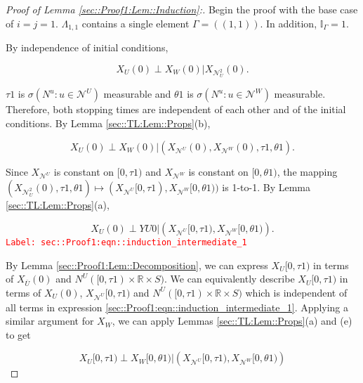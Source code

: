 \documentclass[12pt]{article}
\newcommand{\mb}{\mathbb}
\newcommand{\mc}{\mathcal}
\newcommand{\ov}{\overline}
\newcommand{\tr}{\textcolor{red}}
\newcommand{\labe}[1]{\tr{\texttt{Label: #1}}}
\newcommand{\vv}{u}								%
\renewcommand{\U}{U}							%
\newcommand{\UU}{W}								%
\renewcommand{\S}{S}							%
\newcommand{\X}{X}								%
\newcommand{\neigh}{\mc{N}}						%
\newcommand{\dneigh}{\mc{N}^2}					%
\newcommand{\vind}[1]{^{#1}}					%
\newcommand{\cind}[1]{_{#1}}					%
\newcommand{\cl}{\ov}							%
\newcommand{\tp}[1]{(#1)}						%
\newcommand{\tip}[1]{#1}						%
\newcommand{\poiss}{N}							%
\newcommand{\dnvind}[1]{_{#1}}				%
\newcommand{\XX}{Y}								%
\newcommand{\rt}{\tau}							%
\newcommand{\rtt}{\theta}						%
\newcommand{\apath}{\Gamma}						%
\newcommand{\pathset}[2]{\Lambda_{#1,#2}}		%
\begin{document}
\begin{proof}[Proof of Lemma \ref{sec::Proof1:Lem::Induction}:]
Begin the proof with the base case of \(i=j =1\). \(\pathset{1}{1}\) contains a single element \(\apath{} = ((1,1))\). In addition, \(\mb{I}_{\apath{}} = 1\).

By independence of initial conditions,

\[\X\cind{\U}\tp{0}\perp \X\cind{\UU}\tp{0}|\X\cind{\dneigh\dnvind{\U}}\tp{0}.\]

\(\rt{1}\) is \(\sigma\left(\poiss\vind{\vv}:\vv\in \neigh\vind{\U}\right)\) measurable and \(\rtt{1}\) is \(\sigma\left(\poiss\vind{\vv}:\vv\in \neigh\vind{\UU}\right)\) measurable. Therefore, both stopping times are independent of each other and of the initial conditions. By Lemma \ref{sec::TL:Lem::Props}(b), 

\[\X\cind{\U}\tp{0}\perp \X\cind{\UU}\tp{0}|\left(\X\cind{\neigh\vind{\U}}\tp{0},\X\cind{\neigh\vind{\UU}}\tp{0},\rt{1},\rtt{1}\right).\]

Since \(\X\cind{\neigh\vind{\U}}\tip{}\) is constant on \([0,\rt{1})\) and \(\X\cind{\neigh\vind{\UU}}\tip{}\) is constant on \([0,\rtt{1})\), the mapping \((\X\cind{\dneigh\dnvind{\U}}\tp{0},\rt{1},\rtt{1}) \mapsto (\X\cind{\neigh\vind{\U}}\tip{[0,\rt{1})},\X\cind{\neigh\vind{\UU}}\tip{[0,\rtt{1})})\) is 1-to-1. By Lemma \ref{sec::TL:Lem::Props}(a),

\begin{equation}
\X\cind{\U}\tp{0}\perp \XX{\U}{0}|\left(\X\cind{\neigh\vind{\U}}\tip{[0,\rt{1})},\X\cind{\neigh\vind{\UU}}\tip{[0,\rtt{1})}\right).
\label{sec::Proof1:eqn::induction_intermediate_1}
\end{equation}
\labe{sec::Proof1:eqn::induction\_intermediate\_1}

By Lemma \ref{sec::Proof1:Lem::Decomposition}, we can express \(\X\cind{\U}\tip{[0,\rt{1})}\) in terms of \(\X\cind{\cl{\U}}\tp{0}\) and \(\poiss\vind{\U}([0,\rt{1})\times\mb{R}\times\S)\). We can equivalently describe \(\X\cind{\U}\tip{[0,\rt{1})}\) in terms of \(\X\cind{\U}\tp{0}\), \(\X\cind{\neigh\vind{\U}}\tip{[0,\rt{1})}\) and \(\poiss\vind{\U}([0,\rt{1})\times \mb{R}\times \S)\) which is independent of all terms in expression \eqref{sec::Proof1:eqn::induction_intermediate_1}. Applying a similar argument for \(\X\cind{\UU}\tip{}\), we can apply Lemmas \ref{sec::TL:Lem::Props}(a) and (e) to get

\[\X\cind{\U}\tip{[0,\rt{1})}\perp \X\cind{\UU}\tip{[0,\rtt{1})}|\left(\X\cind{\neigh\vind{\U}}\tip{[0,\rt{1})},\X\cind{\neigh\vind{\UU}}\tip{[0,\rtt{1})}\right)\]


\end{proof}
\end{document}
